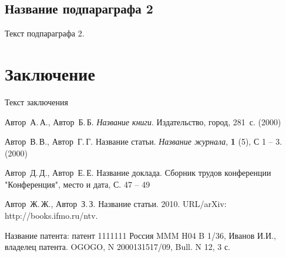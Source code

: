 \documentclass{nsart_eng}
\begin{document}
\subsection{Название подпараграфа 2}
Текст подпараграфа 2.

\section{Заключение}
Текст заключения


\begin{thebibliography}{99}
Автор~А.\,А., Автор~Б.\,Б. {\it Название книги}.  Издательство,  город, 281~с. (2000)

Автор~В.\,В., Автор~Г.\,Г. Название статьи. {\it Название журнала}, {\bf 1} (5), С 1 -- 3. (2000)

Автор~Д.\,Д., Автор~Е.\,Е. Название доклада. Сборник трудов конференции "Конференция", место и дата, С. 47 -- 49

Автор~Ж.\,Ж., Автор~З.\,З. Название статьи.  2010.
URL/arXiv: http://books.ifmo.ru/ntv.

Название патента: патент 1111111 Россия MMM H04 B 1/36, Иванов И.И., владелец патента. OGOGO, N 2000131517/09, Bull. N 12, 3 с.


\end{thebibliography}
\end{document}
